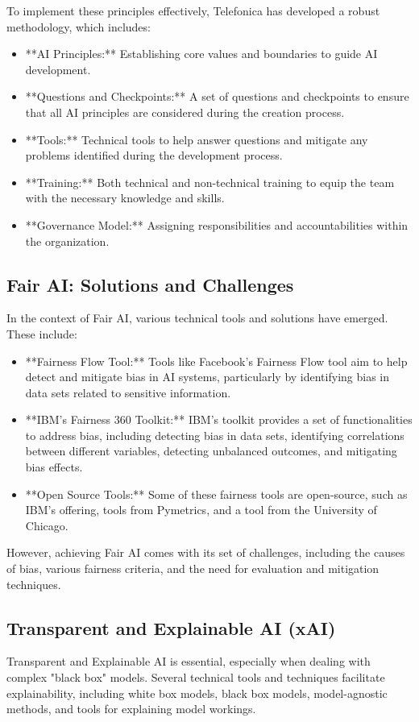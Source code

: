 \documentclass{article}
\begin{document}
To implement these principles effectively, Telefonica has developed a robust methodology, which includes:
\begin{itemize}
    \item **AI Principles:** Establishing core values and boundaries to guide AI development.
    \item **Questions and Checkpoints:** A set of questions and checkpoints to ensure that all AI principles are considered during the creation process.
    \item **Tools:** Technical tools to help answer questions and mitigate any problems identified during the development process.
    \item **Training:** Both technical and non-technical training to equip the team with the necessary knowledge and skills.
    \item **Governance Model:** Assigning responsibilities and accountabilities within the organization.

\end{itemize}

\subsection{Fair AI: Solutions and Challenges}
In the context of Fair AI, various technical tools and solutions have emerged. These include:
\begin{itemize}
    \item **Fairness Flow Tool:** Tools like Facebook's Fairness Flow tool aim to help detect and mitigate bias in AI systems, particularly by identifying bias in data sets related to sensitive information.
    \item **IBM's Fairness 360 Toolkit:** IBM's toolkit provides a set of functionalities to address bias, including detecting bias in data sets, identifying correlations between different variables, detecting unbalanced outcomes, and mitigating bias effects.
    \item **Open Source Tools:** Some of these fairness tools are open-source, such as IBM's offering, tools from Pymetrics, and a tool from the University of Chicago.

\end{itemize}

However, achieving Fair AI comes with its set of challenges, including the causes of bias, various fairness criteria, and the need for evaluation and mitigation techniques.

\subsection{Transparent and Explainable AI (xAI)}
Transparent and Explainable AI is essential, especially when dealing with complex "black box" models. Several technical tools and techniques facilitate explainability, including white box models, black box models, model-agnostic methods, and tools for explaining model workings.
\end{document}
